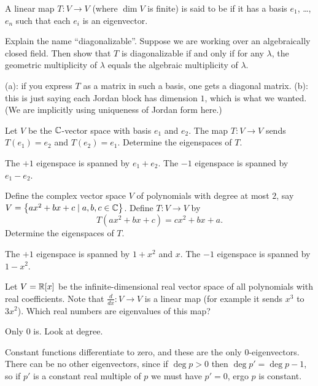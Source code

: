 \begin{problem}
	A linear map $T \colon V \to V$ (where $\dim V$ is finite)
	is said to be 
	if it has a basis $e_1$, \dots, $e_n$
	such that each $e_i$ is an eigenvector.
	\begin{enumerate}[(a)]
		\ii Explain the name ``diagonalizable''.
		\ii Suppose we are working over an algebraically closed field.
		Then show that $T$ is diagonalizable if and only if
		for any $\lambda$, the geometric multiplicity of $\lambda$
		equals the algebraic multiplicity of $\lambda$.
	\end{enumerate}
	\begin{sol}
		(a): if you express $T$ as a matrix in such a basis,
		one gets a diagonal matrix.
		(b): this is just saying each Jordan block has dimension $1$,
		which is what we wanted.
		(We are implicitly using uniqueness of Jordan form here.)
	\end{sol}
\end{problem}

\begin{problem}
	[Switcharoo]
	Let $V$ be the $\mathbb C$-vector space
	with basis $e_1$ and $e_2$.
	The map $T \colon V \to V$ sends $T(e_1) = e_2$ and $T(e_2) = e_1$.
	Determine the eigenspaces of $T$.
	\begin{sol}
		The $+1$ eigenspace is spanned by $e_1+e_2$.
		The $-1$ eigenspace is spanned by $e_1-e_2$.
	\end{sol}
\end{problem}

\begin{problem}
	Define the complex vector space $V$
	of polynomials with degree at most $2$,
	say $V = \left\{ ax^2 + bx + c \mid a,b,c \in \mathbb C \right\}$.
	Define $T \colon V \to V$ by
	\[ T(ax^2+bx+c) = cx^2+bx+a. \]
	Determine the eigenspaces of $T$.
	\begin{sol}
		The $+1$ eigenspace is spanned by $1+x^2$ and $x$.
		The $-1$ eigenspace is spanned by $1-x^2$.
	\end{sol}
\end{problem}

\begin{problem}
	Let $V = \mathbb R[x]$ be the infinite-dimensional real vector space of
	all polynomials with real coefficients.
	Note that $\frac{d}{dx} \colon V \to V$ is a linear map
	(for example it sends $x^3$ to $3x^2$).
	Which real numbers are eigenvalues of this map?
	\begin{hint}
		Only $0$ is.
		Look at degree.
	\end{hint}
	\begin{sol}
		Constant functions differentiate to zero,
		and these are the only $0$-eigenvectors.
		There can be no other eigenvectors,
		since if $\deg p > 0$ then $\deg p' = \deg p - 1$,
		so if $p'$ is a constant real multiple of $p$
		we must have $p' = 0$, ergo $p$ is constant.
	\end{sol}
\end{problem}

